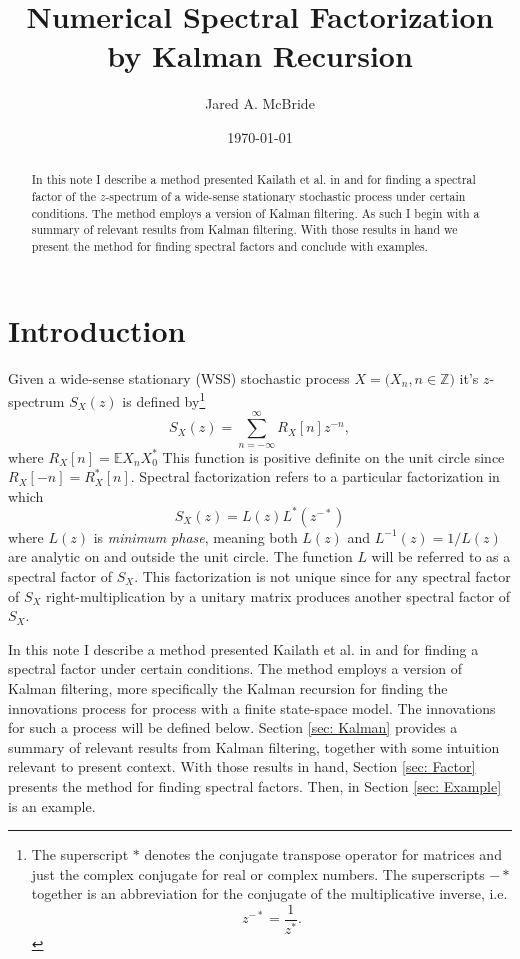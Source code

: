 \documentclass[12pt]{amsart}
\title{Numerical Spectral Factorization by Kalman Recursion}
\author{Jared A. McBride}
\date{\today}
\newcommand{\E}{\mathbb{E}}
\newcommand{\Z}{\mathbb{Z}}
\begin{document}
	
\begin{abstract}
	In this note I describe a method presented Kailath et al. in \cite{sayed2001} and \cite{kailath2000} for finding a spectral factor of the $z$-spectrum of a wide-sense stationary stochastic process under certain conditions. The method employs a version of Kalman filtering. As such I begin with a summary of relevant results from Kalman filtering. With those results in hand we present the method for finding spectral factors and conclude with examples.
\end{abstract}

\maketitle
\tableofcontents

\section{Introduction}

Given a wide-sense stationary (WSS) stochastic process $X = \big(X_n, n \in \Z\big)$ it's $z$-spectrum $S_X(z)$ is defined by\footnote{
	The superscript $*$ denotes the conjugate transpose operator for matrices and just the complex conjugate for real or complex numbers. The superscripts $-*$ together is an abbreviation for the conjugate of the multiplicative inverse, i.e. $$z^{-*} = \frac{1}{z^*}.$$
	} 
$$S_X(z) = \sum_{n=-\infty}^\infty R_X[n]z^{-n},$$
where $R_X[n] = \E X_nX_0^*$ This function is positive definite on the unit circle since $R_X[-n] = R_X^*[n]$. 
Spectral factorization refers to a particular factorization in which 
$$S_X(z) = L(z)L^*(z^{-*})$$
where $L(z)$ is \emph{minimum phase}, meaning both $L(z)$ and $L^{-1}(z) = 1/L(z)$ are analytic on and outside the unit circle. The function $L$ will be referred to as a spectral factor of $S_X$. This factorization is not unique since for any spectral factor of $S_X$ right-multiplication by a unitary matrix produces another spectral factor of $S_X$. 

In this note I describe a method presented Kailath et al. in \cite{sayed2001} and \cite[p.~336]{kailath2000} for finding a spectral factor under certain conditions. The method employs a version of Kalman filtering, more specifically the Kalman recursion for finding the innovations process for process with a finite state-space model. The innovations for such a process will be defined below. Section \ref{sec: Kalman} provides a summary of relevant results from Kalman filtering, together with some intuition relevant to present context. With those results in hand, Section \ref{sec: Factor} presents the method for finding spectral factors. Then, in Section \ref{sec: Example} is an example.  
\end{document}
